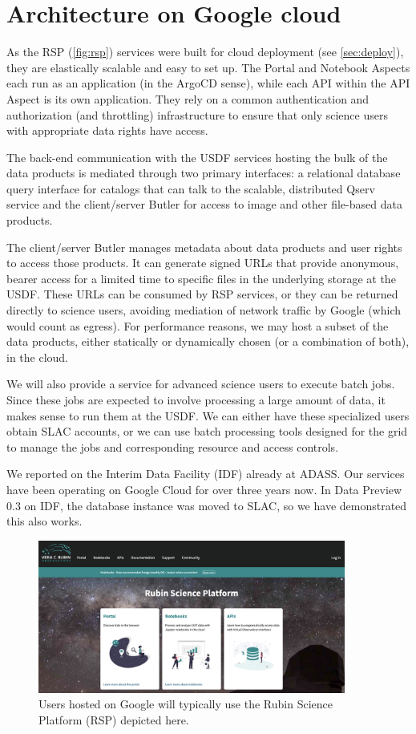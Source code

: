 \section{Architecture on Google cloud} \label{sec:google}

As the RSP (\autoref{fig:rsp})  services were built for cloud deployment (see \autoref{sec:deploy}), they are elastically scalable and easy to set up.
The Portal and Notebook Aspects each run as an application (in the ArgoCD sense), while each API within the API Aspect is its own application.
They rely on a common authentication and authorization (and throttling) infrastructure to ensure that only science users with appropriate data rights have access.

The back-end communication with the USDF services hosting the bulk of the data products is mediated through two primary interfaces: a relational database query interface for catalogs that can talk to the scalable, distributed Qserv service\cite{2011Wang:2011:QDS:2063348.2063364, DMTN-243} and the client/server Butler\cite{2024SPIE13101.129Jtmp,2022SPIE12189E..11J} for access to image and other file-based data products.

The client/server Butler manages metadata about data products and user rights to access those products.
It can generate signed URLs that provide anonymous, bearer access for a limited time to specific files in the underlying storage at the USDF.
These URLs can be consumed by RSP services, or they can be returned directly to science users, avoiding mediation of network traffic by Google (which would count as egress).
For performance reasons, we may host a subset of the data products, either statically or dynamically chosen (or a combination of both), in the cloud.

We will also provide a service for advanced science users to execute batch jobs.
Since these jobs are expected to involve processing a large amount of data, it makes sense to run them at the USDF.
We can either have these specialized users obtain SLAC accounts, or we can use batch processing tools designed for the grid to manage the jobs and corresponding resource and access controls.

We reported on the Interim Data Facility (IDF) already at ADASS\cite{2021arXiv211115030O}.
Our services have been operating on Google Cloud for over three years now.
In Data Preview 0.3 on IDF,\cite{RTN-050} the database instance was moved to SLAC, so we have demonstrated this also works.


\begin{figure}
\begin{centering}
\includegraphics[width=0.9\textwidth]{RSP.png}
	\caption{ Users hosted on Google will typically use the Rubin Science Platform (RSP) depicted here.  \label{fig:rsp}}
\end{centering}
\end{figure}
